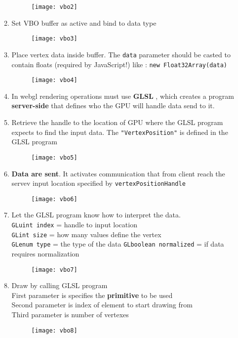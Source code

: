 \begin{itemize}
\begin{enumerate}
   \begin{figure}[H]
 \centering
 \texttt{[image: vbo2]} 
 \end{figure}
 \item Set VBO buffer as active and bind to data type
    \begin{figure}[H]
 \centering
 \texttt{[image: vbo3]} 
 \end{figure}
 \item Place vertex data inside buffer. The \texttt{data} parameter should be casted to contain floats (required by JavaScript!) like : \texttt{new Float32Array(data) }
    \begin{figure}[H]
 \centering
 \texttt{[image: vbo4]} 
 \end{figure}
\item  In webgl rendering operations must use \textbf{GLSL} , which creates a program \textbf{server-side} that defines who the GPU will handle data send to it.

 \item Retrieve the handle to the location of GPU where the GLSL program expects to find the input data. The \texttt{"VertexPosition"} is defined in the GLSL program 
     \begin{figure}[H]
 \centering
 \texttt{[image: vbo5]} 
 \end{figure}
 \item \textbf{Data are sent}. It activates communication that from client reach the servev input location specified by \texttt{vertexPositionHandle}
      \begin{figure}[H]
 \centering
 \texttt{[image: vbo6]} 
 \end{figure}
 \item Let the GLSL program know how to interpret the data.\\
 \texttt{GLuint index} = handle to input location\\
 \texttt{GLint size} = how many values define the vertex\\
 \texttt{GLenum type} = the type of the data
 \texttt{GLboolean normalized} = if data requires normalization
      \begin{figure}[H]
 \centering
 \texttt{[image: vbo7]} 
 \end{figure}
 \item Draw by calling GLSL program \\
 First parameter is specifies the \textbf{primitive} to be used\\
 Second parameter is index of element to start drawing from \\
 Third parameter is number of vertexes
       \begin{figure}[H]
 \centering
 \texttt{[image: vbo8]} 
 \end{figure}
\end{enumerate}
\end{itemize}

